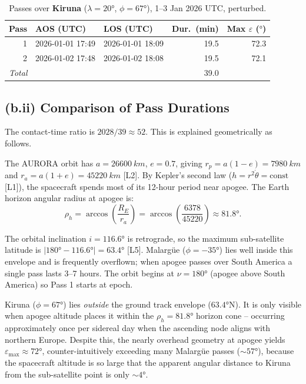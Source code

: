 \documentclass[11pt,a4paper]{article}
\begin{document}
\begin{table}[H]
\centering
\caption{Passes over \textbf{Kiruna} ($\lambda=20°$, $\phi=67°$), 1--3 Jan 2026 UTC, perturbed.\label{tab:kir}}
\small
\begin{tabular}{@{}rllrr@{}}
\toprule
Pass & AOS (UTC) & LOS (UTC) & Dur.\ (min) & Max $\varepsilon$ ($°$) \\
\midrule
1 & 2026-01-01 17:49 & 2026-01-01 18:09 & 19.5 & 72.3 \\
2 & 2026-01-02 17:48 & 2026-01-02 18:08 & 19.5 & 72.1 \\
\midrule
\multicolumn{3}{l}{\textit{Total}} & 39.0 & \\
\bottomrule
\end{tabular}
\end{table}

\subsection*{(b.ii) Comparison of Pass Durations}

The contact-time ratio is $2028/39 \approx 52$. This is explained geometrically as follows.

The AURORA orbit has $a=\SI{26600}{km}$, $e=0.7$, giving $r_p = a(1-e)=\SI{7980}{km}$ and $r_a = a(1+e)=\SI{45220}{km}$ [L2]. By Kepler's second law ($h=r^2\dot\theta=\mathrm{const}$ [L1]), the spacecraft spends most of its 12-hour period near apogee. The Earth horizon angular radius at apogee is:
\begin{equation}
    \rho_h = \arccos\!\left(\frac{R_E}{r_a}\right) = \arccos\!\left(\frac{6378}{45220}\right) \approx 81.8°.
\end{equation}

The orbital inclination $i=116.6°$ is retrograde, so the maximum sub-satellite latitude is $|180°-116.6°|=63.4°$ [L5]. Malarg\"{u}e ($\phi=-35°$) lies well inside this envelope and is frequently overflown; when apogee passes over South America a single pass lasts 3--7 hours. The orbit begins at $\nu=180°$ (apogee above South America) so Pass 1 starts at epoch.

Kiruna ($\phi=67°$) lies \emph{outside} the ground track envelope ($63.4°\mathrm{N}$). It is only visible when apogee altitude places it within the $\rho_h=81.8°$ horizon cone -- occurring approximately once per sidereal day when the ascending node aligns with northern Europe. Despite this, the nearly overhead geometry at apogee yields $\varepsilon_{\max}\approx72°$, counter-intuitively exceeding many Malarg\"{u}e passes ($\sim57°$), because the spacecraft altitude is so large that the apparent angular distance to Kiruna from the sub-satellite point is only $\sim4°$.
\end{document}
